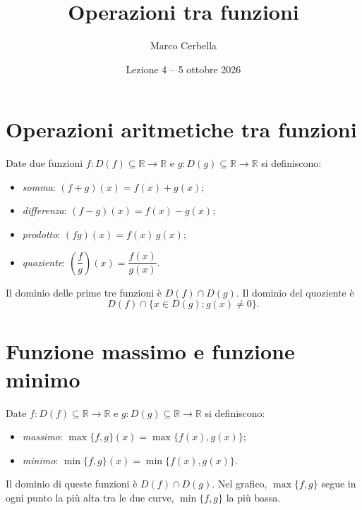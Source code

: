 \documentclass[11pt,a4paper]{article}
\title{Operazioni tra funzioni}
\author{Marco Cerbella}
\date{Lezione 4 -- 5 ottobre 2026}
\begin{document}
\maketitle

\section{Operazioni aritmetiche tra funzioni}

Date due funzioni $f : D(f) \subseteq \mathbb{R} \to \mathbb{R}$ e $g : D(g) \subseteq \mathbb{R} \to \mathbb{R}$ si definiscono:
\begin{itemize}
    \item \emph{somma}: $(f + g)(x) = f(x) + g(x)$;
    \item \emph{differenza}: $(f - g)(x) = f(x) - g(x)$;
    \item \emph{prodotto}: $(fg)(x) = f(x)\,g(x)$;
    \item \emph{quoziente}: $\left(\dfrac{f}{g}\right)(x) = \dfrac{f(x)}{g(x)}$.
\end{itemize}
Il dominio delle prime tre funzioni è $D(f) \cap D(g)$. Il dominio del quoziente è
\[
D(f) \cap \{x \in D(g) : g(x) \neq 0\}.
\]

\section{Funzione massimo e funzione minimo}

Date $f : D(f) \subseteq \mathbb{R} \to \mathbb{R}$ e $g : D(g) \subseteq \mathbb{R} \to \mathbb{R}$ si definiscono:
\begin{itemize}
    \item \emph{massimo}: $\max\{f, g\}(x) = \max\{f(x), g(x)\}$;
    \item \emph{minimo}: $\min\{f, g\}(x) = \min\{f(x), g(x)\}$.
\end{itemize}
Il dominio di queste funzioni è $D(f) \cap D(g)$. Nel grafico, $\max\{f, g\}$ segue in ogni punto la più alta tra le due curve, $\min\{f, g\}$ la più bassa.
\end{document}
